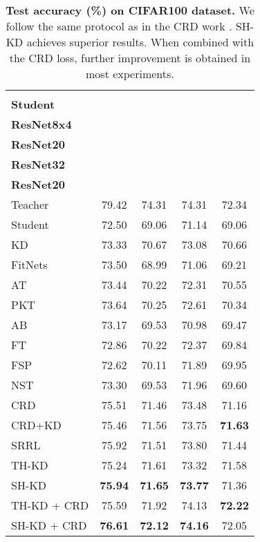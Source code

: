\label{results}

\label{table_fine_grained}


\begin{table}[t!]

\setlength{\tabcolsep}{4.5pt}
\begin{center}
\begin{tabular}{|l||c|c|c|c|}
\hline
\thead{\textbf{Teacher} \\ \textbf{Student}} & \thead{\textbf{ResNet32x4}\\\textbf{ResNet8x4}}  & \thead{\textbf{ResNet110}\\\textbf{ResNet20}} & \thead{\textbf{ResNet110}\\\textbf{ResNet32}} & \thead{\textbf{ResNet56}\\\textbf{ResNet20}} \\
\hline
Teacher & 79.42 & 74.31 & 74.31 & 72.34 \\
Student & 72.50  & 69.06 & 71.14 & 69.06 \\
\hline

KD \cite{hinton2015distilling} & 73.33  & 70.67 & 73.08 & 70.66 \\
FitNets \cite{romero2015fitnets} & 73.50  & 68.99 & 71.06 & 69.21  \\
AT \cite{passalis2019learning} & 73.44  & 70.22 & 72.31 & 70.55 \\
PKT \cite{passalis2019learning}  & 73.64 & 70.25 & 72.61  & 70.34 \\
AB \cite{heo2018knowledge} & 73.17 & 69.53 & 70.98  & 69.47  \\
FT \cite{kim2020paraphrasing} & 72.86 & 70.22 & 72.37 & 69.84 \\
FSP \cite{8100237} & 72.62 & 70.11 & 71.89 & 69.95 \\
NST \cite{huang2017like} & 73.30 & 69.53 & 71.96 & 69.60  \\
CRD \cite{tian2020contrastive}  & 75.51 & 71.46 & 73.48 & 71.16 \\
CRD+KD \cite{tian2020contrastive} & 75.46  & 71.56 & 73.75 & \textbf{71.63}  \\
SRRL \cite{Yang2021KnowledgeDV} & 75.92 & 71.51 & 73.80 & 71.44 \\
\hline
TH-KD & 75.24   & 71.61 & 73.32 & 71.58 \\
SH-KD & \textbf{75.94}  & \textbf{71.65} & \textbf{73.77} & 71.36  \\
\hline
TH-KD + CRD  & 75.59 & 71.92 & 74.13 & \textbf{72.22} \\
SH-KD + CRD & \textbf{76.61} & \textbf{72.12} & \textbf{74.16} & 72.05 \\
\hline
\end{tabular}
\vspace{0.2cm}
\caption{\textbf{Test accuracy (\%) on CIFAR100 dataset.} We follow the same protocol as in the CRD work \protect\cite{tian2020contrastive}. SH-KD achieves superior results. When combined with the CRD loss, further improvement is obtained in most experiments.}
\label{tbl:cifar100_same}
\end{center}
\vspace{-20pt}
\end{table}
